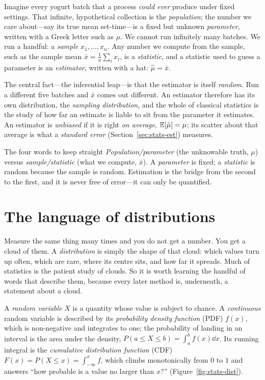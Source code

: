 Imagine every yogurt batch that a process \emph{could ever} produce under fixed
settings. That infinite, hypothetical collection is the \emph{population}; the
number we care about---say its true mean set-time---is a fixed but unknown
\emph{parameter}, written with a Greek letter such as $\mu$. We cannot run
infinitely many batches. We run a handful: a \emph{sample}
$x_1,\dots,x_n$. Any number we compute from the sample, such as the sample mean
$\bar x = \tfrac1n\sum_i x_i$, is a \emph{statistic}, and a statistic used to
guess a parameter is an \emph{estimator}, written with a hat: $\hat\mu = \bar x$.

The central fact---the inferential leap---is that the estimator is itself
\emph{random}. Run a different five batches and $\bar x$ comes out different. An
estimator therefore has its own distribution, the \emph{sampling distribution},
and the whole of classical statistics is the study of how far an estimate is
liable to sit from the parameter it estimates. An estimator is \emph{unbiased}
if it is right \emph{on average}, $\mathbb{E}[\hat\mu]=\mu$; its scatter about that
average is what a \emph{standard error} (Section~\ref{sec:stats-est}) measures.

\begin{keybox}{The four words to keep straight}
\emph{Population/parameter} (the unknowable truth, $\mu$) versus
\emph{sample/statistic} (what we compute, $\bar x$). A \emph{parameter} is fixed;
a \emph{statistic} is random because the sample is random. Estimation is the
bridge from the second to the first, and it is never free of error---it can only
be quantified.
\end{keybox}

\section{The language of distributions}
\label{sec:stats-dist}

Measure the same thing many times and you do not get a number. You get a cloud
of them. A \emph{distribution} is simply the shape of that cloud: which values
turn up often, which are rare, where its centre sits, and how far it spreads.
Much of statistics is the patient study of clouds. So it is worth learning the
handful of words that describe them, because every later method is, underneath,
a statement about a cloud.

A \emph{random variable} $X$ is a quantity whose value is subject to chance.
A \emph{continuous} random variable is described by its \emph{probability
density function} (PDF) $f(x)$, which is non-negative and integrates to one; the
probability of landing in an interval is the area under the density,
$P(a\le X\le b)=\int_a^b f(x)\dd x$. Its running integral is the
\emph{cumulative distribution function} (CDF) $F(x)=P(X\le x)=\int_{-\infty}^x
f$, which climbs monotonically from $0$ to $1$ and answers ``how probable is a
value no larger than $x$?'' (Figure~\ref{fig:stats-dist}).

